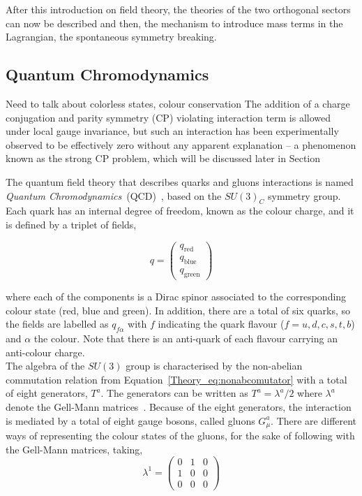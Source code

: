 After this introduction on field theory, the theories of the two orthogonal sectors can now be described and then, the mechanism to introduce mass terms in the Lagrangian, the spontaneous symmetry breaking.

\subsection{Quantum Chromodynamics}
Need to talk about colorless states, colour conservation
The addition of a charge conjugation and parity symmetry (CP) violating interaction term is allowed under local gauge invariance, but such an interaction has been experimentally observed to be effectively zero without any apparent explanation – a phenomenon known as the strong CP problem, which will be discussed later in Section

The quantum field theory that describes quarks and gluons interactions is named \textit{Quantum Chromodynamics}~(QCD)~\cite{QCD}, based on the $SU(3)_C$ symmetry group. Each quark has an internal degree of freedom, known as the colour charge, and it is defined by a triplet of fields,

\begin{equation}
\label{Theory_eq:colortriplet}
    q=\begin{pmatrix}
    q_{\mathrm{red}}\\
    q_{\mathrm{blue}}\\
    q_{\mathrm{green}}
    \end{pmatrix}
\end{equation}

where each of the components is a Dirac spinor associated to the corresponding colour state (red, blue and green). In addition, there are a total of six quarks, so the fields are labelled as $q_{f\alpha}$ with $f$ indicating the quark flavour ($f=u,d,c,s,t,b$) and $\alpha$ the colour. Note that there is an anti-quark of each flavour carrying an anti-colour charge.\\

The algebra of the $SU(3)$ group is characterised by the non-abelian commutation relation from Equation~\ref{Theory_eq:nonabcomutator} with a total of eight generators, $T^a$. The generators can be written as $T^a=\lambda^a/2$ where $\lambda^a$ denote the Gell-Mann matrices~\cite{GellMann}. Because of the eight generators, the interaction is mediated by a total of eight gauge bosons, called gluons $G_\mu^a$. There are different ways of representing the colour states of the gluons, for the sake of following with the Gell-Mann matrices, taking, 
\begin{equation}
\lambda^1 = \begin{pmatrix} 0 & 1 & 0 \\
1 & 0 & 0 \\
0 & 0 & 0 \end{pmatrix}
\end{equation}

